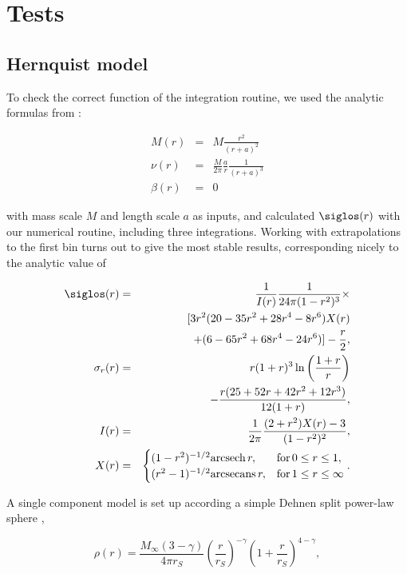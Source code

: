 \section{Tests}\label{sec:tests}

\subsection{Hernquist model}
To check the correct function of the integration routine, we used the
analytic formulas from \cite{Hernquist1990}:

\begin{eqnarray}
M(r) &=& M\frac{r^2}{(r+a)^2}\\
\nu(r) &=& \frac{M}{2\pi}\frac{a}{r}\frac{1}{(r+a)^3}\\
\beta(r) &=& 0
\end{eqnarray}

with mass scale $M$ and length scale $a$ as inputs, and calculated
$\siglos(r)$ with our numerical routine, including three
integrations. Working with extrapolations to the first bin turns out
to give the most stable results, corresponding nicely to the analytic
value  of

\begin{eqnarray*}
\siglos(r) &=& \frac{1}{I(r)}\frac{1}{24\pi(1-r^2)^3}\times\\
           && \qquad [3r^2(20-35r^2+28r^4-8r^6)X(r) \\
           && \qquad + (6-65r^2+68r^4-24r^6)]-\frac{r}{2},\\
\sigma_r(r) &=& r(1+r)^3 \ln\left(\frac{1+r}{r}\right)\\
 &&\qquad-\frac{r(25+52r+42r^2+12r^3)}{12(1+r)},\\
I(r) &=& \frac{1}{2\pi}\frac{(2+r^2)X(r)-3}{(1-r^2)^2},\\
X(r) &=& \begin{cases}(1-r^2)^{-1/2} \text{arcsech}\,r,& \text{for}\,0\leq r\leq 1,\\
                (r^2-1)^{-1/2} \text{arcsecans}\,r,& \text{for}\,1\leq r\leq\infty
                \end{cases}.
\end{eqnarray*}



A single component model is set up according a simple Dehnen split
power-law sphere \cite{Read+2006},

\begin{equation}
\rho(r) = \frac{M_\infty(3-\gamma)}{4\pi r_S}\left(\frac{r}{r_S}\right)^{-\gamma}\left(1+\frac{r}{r_S}\right)^{4-\gamma},
\end{equation}

